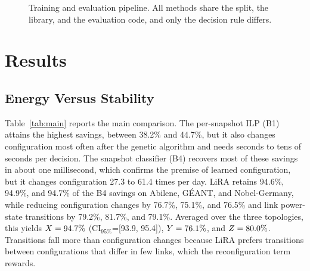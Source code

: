 \documentclass[journal]{IEEEtran}
\begin{document}
\begin{figure}[t]
\centering
{}
\caption{Training and evaluation pipeline. All methods share the split, the library, and the evaluation code, and only the decision rule differs.}
\label{fig:pipeline}
\end{figure}

\section{Results}\label{sec:results}

\subsection{Energy Versus Stability}

Table~\ref{tab:main} reports the main comparison. The per-snapshot ILP (B1) attains the highest savings, between 38.2\% and 44.7\%, but it also changes configuration most often after the genetic algorithm and needs seconds to tens of seconds per decision. The snapshot classifier (B4) recovers most of these savings in about one millisecond, which confirms the premise of learned configuration, but it changes configuration 27.3 to 61.4 times per day. LiRA retains 94.6\%, 94.9\%, and 94.7\% of the B4 savings on Abilene, G\'{E}ANT, and Nobel-Germany, while reducing configuration changes by 76.7\%, 75.1\%, and 76.5\% and link power-state transitions by 79.2\%, 81.7\%, and 79.1\%. Averaged over the three topologies, this yields $X=94.7\%$ (CI$_{95\%}$=[93.9, 95.4]), $Y=76.1\%$, and $Z=80.0\%$. Transitions fall more than configuration changes because LiRA prefers transitions between configurations that differ in few links, which the reconfiguration term rewards.
\end{document}
